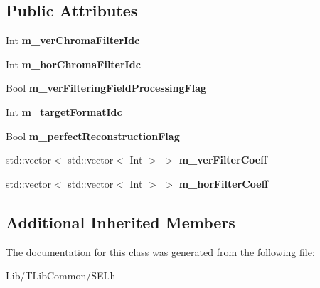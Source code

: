 \subsection*{Public Attributes}
\begin{DoxyCompactItemize}
\item 
\mbox{\label{class_s_e_i_chroma_resampling_filter_hint_a6e83e301e0ef56b6066257b7ca1bea90}} 
Int {\bfseries m\+\_\+ver\+Chroma\+Filter\+Idc}
\item 
\mbox{\label{class_s_e_i_chroma_resampling_filter_hint_a9908acdeedca756fec39a1e19eb9aee7}} 
Int {\bfseries m\+\_\+hor\+Chroma\+Filter\+Idc}
\item 
\mbox{\label{class_s_e_i_chroma_resampling_filter_hint_a9aaaef48624a2574d3bd7af01f9d37be}} 
Bool {\bfseries m\+\_\+ver\+Filtering\+Field\+Processing\+Flag}
\item 
\mbox{\label{class_s_e_i_chroma_resampling_filter_hint_af044ce0a57ffa5edf2d493411f214bf9}} 
Int {\bfseries m\+\_\+target\+Format\+Idc}
\item 
\mbox{\label{class_s_e_i_chroma_resampling_filter_hint_a03219bfef608e2b6b293f9593fdeb96c}} 
Bool {\bfseries m\+\_\+perfect\+Reconstruction\+Flag}
\item 
\mbox{\label{class_s_e_i_chroma_resampling_filter_hint_a080c6e3cf9c96f8dec5e521011419025}} 
std\+::vector$<$ std\+::vector$<$ Int $>$ $>$ {\bfseries m\+\_\+ver\+Filter\+Coeff}
\item 
\mbox{\label{class_s_e_i_chroma_resampling_filter_hint_a52332ce6f368d7dd1548fb2dfbfcd3b1}} 
std\+::vector$<$ std\+::vector$<$ Int $>$ $>$ {\bfseries m\+\_\+hor\+Filter\+Coeff}
\end{DoxyCompactItemize}
\subsection*{Additional Inherited Members}


The documentation for this class was generated from the following file\+:\begin{DoxyCompactItemize}
\item 
Lib/\+T\+Lib\+Common/S\+E\+I.\+h\end{DoxyCompactItemize}
